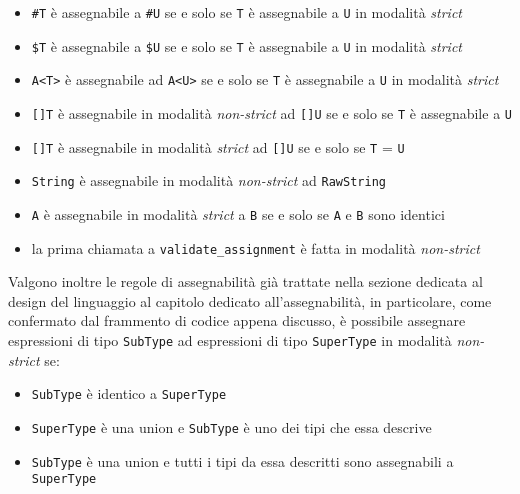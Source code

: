 \begin{itemize}
    \item \texttt{\#T} è assegnabile a \texttt{\#U} se e solo se \texttt{T} è assegnabile a \texttt{U} in modalità \textit{strict}
    \item \texttt{\$T} è assegnabile a \texttt{\$U} se e solo se \texttt{T} è assegnabile a \texttt{U} in modalità \textit{strict}
    \item \texttt{A<T>} è assegnabile ad \texttt{A<U>} se e solo se \texttt{T} è assegnabile a \texttt{U} in modalità \textit{strict}
    \item \texttt{[]T} è assegnabile in modalità \textit{non-strict} ad \texttt{[]U} se e solo se \texttt{T} è assegnabile a \texttt{U}
    \item \texttt{[]T} è assegnabile in modalità \textit{strict} ad \texttt{[]U} se e solo se \texttt{T} = \texttt{U}
    \item \texttt{String} è assegnabile in modalità \textit{non-strict} ad \texttt{RawString}
    \item \texttt{A} è assegnabile in modalità \textit{strict} a \texttt{B} se e solo se \texttt{A} e \texttt{B} sono identici
    \item la prima chiamata a \texttt{validate\_assignment} è fatta in modalità \textit{non-strict}
\end{itemize}

Valgono inoltre le regole di assegnabilità già trattate nella sezione dedicata al design del linguaggio al 
capitolo dedicato all'assegnabilità, in particolare, come confermato dal frammento di codice appena discusso, 
è possibile assegnare espressioni di tipo \texttt{SubType} ad espressioni di tipo \texttt{SuperType} in modalità 
\textit{non-strict} se: \\

\begin{itemize}
    \item \texttt{SubType} è identico a \texttt{SuperType}
    \item \texttt{SuperType} è una union e \texttt{SubType} è uno dei tipi che essa descrive
    \item \texttt{SubType} è una union e tutti i tipi da essa descritti sono assegnabili a \texttt{SuperType}    
\end{itemize}